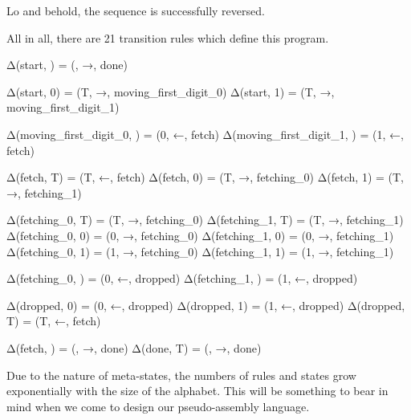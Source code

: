 Lo and behold, the sequence is successfully reversed.

All in all, there are 21 transition rules which define this program.
\begin{stdout}
Δ(start, ) = (, →, done)

Δ(start, 0) = (T, →, moving_first_digit_0)
Δ(start, 1) = (T, →, moving_first_digit_1)

Δ(moving_first_digit_0, ) = (0, ←, fetch)
Δ(moving_first_digit_1, ) = (1, ←, fetch)

Δ(fetch, T) = (T, ←, fetch)
Δ(fetch, 0) = (T, →, fetching_0)
Δ(fetch, 1) = (T, →, fetching_1)

Δ(fetching_0, T) = (T, →, fetching_0)
Δ(fetching_1, T) = (T, →, fetching_1)
Δ(fetching_0, 0) = (0, →, fetching_0)
Δ(fetching_1, 0) = (0, →, fetching_1)
Δ(fetching_0, 1) = (1, →, fetching_0)
Δ(fetching_1, 1) = (1, →, fetching_1)

Δ(fetching_0, ) = (0, ←, dropped)
Δ(fetching_1, ) = (1, ←, dropped)

Δ(dropped, 0) = (0, ←, dropped)
Δ(dropped, 1) = (1, ←, dropped)
Δ(dropped, T) = (T, ←, fetch)

Δ(fetch, ) = (, →, done)
Δ(done, T) = (, →, done)
\end{stdout}
Due to the nature of meta-states, the numbers of rules and states grow exponentially with the size of the alphabet. This will be something to bear in mind when we come to design our pseudo-assembly language.